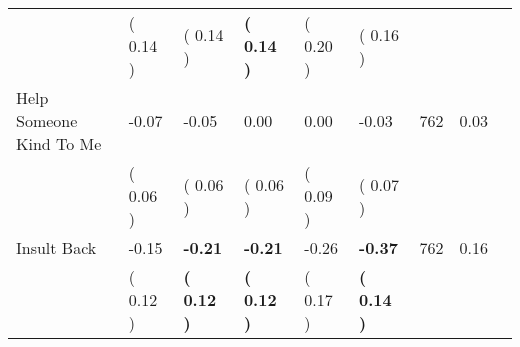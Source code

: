\begin{tabular}{L{6.2cm} C{1.8cm} C{1.8cm} C{1.8cm} C{1.8cm} C{1.8cm} C{1.8cm} C{0.3cm} C{0.3cm}}
 & (     0.14 ) & (     0.14 ) & \textbf{(     0.14 )} & (     0.20 ) & (     0.16 )  & \\
Help Someone Kind To Me &     -0.07 &     -0.05 &      0.00 &      0.00 &     -0.03  & 762 &       0.03 \\ 
 & (     0.06 ) & (     0.06 ) & (     0.06 ) & (     0.09 ) & (     0.07 )  & \\
Insult Back &     -0.15 & \textbf{    -0.21} & \textbf{    -0.21} &     -0.26 & \textbf{    -0.37}  & 762 &       0.16 \\ 
 & (     0.12 ) & \textbf{(     0.12 )} & \textbf{(     0.12 )} & (     0.17 ) & \textbf{(     0.14 )}  & \\
\bottomrule
\end{tabular}
